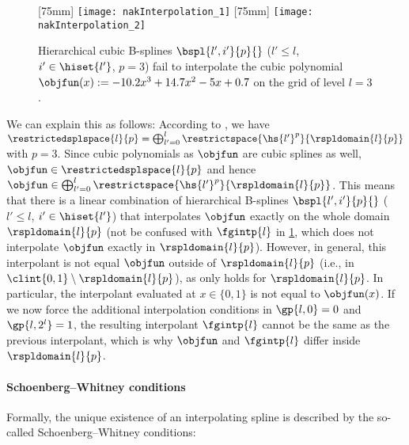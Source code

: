 \begin{figure}
  [75mm]{%
    \texttt{[image: nakInterpolation\_1]}%
  }%
  \hfill%
  [75mm]{%
    \texttt{[image: nakInterpolation\_2]}%
  }%
  \caption[%
    Issues when interpolating with uniform hierarchical B-splines%
  ]{%
    Hierarchical cubic B-splines $\bspl{l',i'}{p}{}$
    ($l' \le l$, $i' \in \hiset{l'}$, $p = 3$)
    fail to interpolate the cubic polynomial
    $\objfun(x) := -10.2 x^3 + 14.7 x^2 - 5x + 0.7$
    on the grid of level $l = 3$.%
  }%
  \label{fig:nakInterpolation}%
\end{figure}

We can explain this as follows:
According to ,
we have $\restrictedsplspace{l}{p} = \bigoplus_{l'=0}^l \restrictspace{\hs{l'}^p}{\rspldomain{l}{p}}$
with $p = 3$.
Since cubic polynomials as $\objfun$ are cubic splines as well,
$\objfun \in \restrictedsplspace{l}{p}$ and hence
$\objfun \in \bigoplus_{l'=0}^l \restrictspace{\hs{l'}^p}{\rspldomain{l}{p}}$.
This means that there is a linear combination of hierarchical B-splines
$\bspl{l',i'}{p}{}$ ($l' \le l$, $i' \in \hiset{l'}$)
that interpolates $\objfun$ exactly on the whole domain $\rspldomain{l}{p}$
(not be confused with $\fgintp{l}$ in \cref{fig:nakInterpolation},
which does not interpolate $\objfun$ exactly in $\rspldomain{l}{p}$).
However, in general, this interpolant is not equal $\objfun$ outside
of $\rspldomain{l}{p}$ (i.e., in $\clint{0, 1} \setminus \rspldomain{l}{p}$),
as  only holds for $\rspldomain{l}{p}$.
In particular, the interpolant evaluated at $x \in \{0, 1\}$ is not
equal to $\objfun(x)$.
If we now force the additional interpolation conditions in
$\gp{l,0} = 0$ and $\gp{l,2^l} = 1$,
the resulting interpolant $\fgintp{l}$ cannot be the same as the previous
interpolant,
which is why $\objfun$ and $\fgintp{l}$ differ inside $\rspldomain{l}{p}$.

\paragraph{Schoenberg--Whitney conditions}

Formally, the unique existence of an interpolating spline is
described by the so-called Schoenberg--Whitney conditions:


